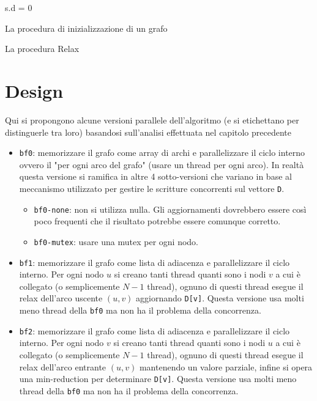 \documentclass[a4paper]{article}
\begin{document}
	\begin{algorithm}[H]
		\label{alg:init}
		s.d = 0\;
		\caption{La procedura di inizializzazione di un grafo}
	\end{algorithm}

	\begin{algorithm}[H]
		\label{alg:relax}
		\caption{La procedura Relax}
	\end{algorithm}
	
	\section{Design}
	\label{section:design}
	Qui si propongono alcune versioni parallele dell'algoritmo (e si etichettano per distinguerle tra loro) basandosi sull'analisi effettuata nel capitolo precedente
	
	\begin{itemize}
		\item \texttt{bf0}: memorizzare il grafo come array di archi e parallelizzare il ciclo interno ovvero il "per ogni arco del grafo" (usare un thread per ogni arco). In realtà questa versione si ramifica in altre 4 sotto-versioni che variano in base al meccanismo utilizzato per gestire le scritture concorrenti sul vettore \texttt{D}.
		\begin{itemize}
			\item \texttt{bf0-none}: non si utilizza nulla. Gli aggiornamenti dovrebbero essere così poco frequenti che il risultato potrebbe essere comunque corretto.
			\item \texttt{bf0-mutex}: usare una mutex per ogni nodo.
		\end{itemize}
	
		\item \texttt{bf1}: memorizzare il grafo come lista di adiacenza e parallelizzare il ciclo interno. Per ogni nodo $u$ si creano tanti thread quanti sono i nodi $v$ a cui è collegato (o semplicemente $N-1$ thread), ognuno di questi thread esegue il relax dell'arco uscente $(u,v)$ aggiornando \texttt{D[v]}. Questa versione usa molti meno thread della \texttt{bf0} ma non ha il problema della concorrenza.
		
		\item \texttt{bf2}: memorizzare il grafo come lista di adiacenza e parallelizzare il ciclo interno. Per ogni nodo $v$ si creano tanti thread quanti sono i nodi $u$ a cui è collegato (o semplicemente $N-1$ thread), ognuno di questi thread esegue il relax dell'arco entrante $(u,v)$ mantenendo un valore parziale, infine si opera una min-reduction per determinare \texttt{D[v]}. Questa versione usa molti meno thread della \texttt{bf0} ma non ha il problema della concorrenza.
	\end{itemize}
	
\end{document}
